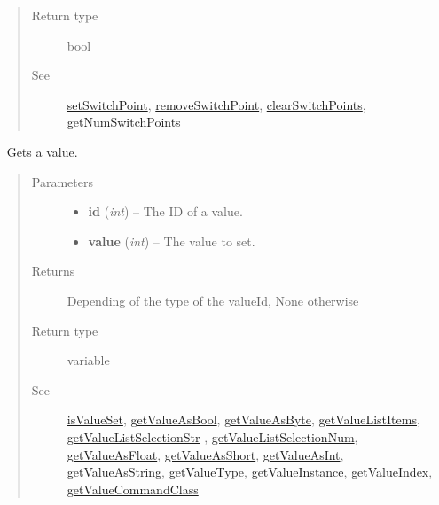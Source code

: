 \documentclass[letterpaper,10pt,english]{sphinxmanual}
\begin{document}
\begin{fulllineitems}
\begin{fulllineitems}
\begin{quote}
\begin{description}
\item[{Return type}] \leavevmode
bool

\item[{See}] \leavevmode
{\hyperref[libopenzwave:setswitchpoint]{setSwitchPoint}}, {\hyperref[libopenzwave:removeswitchpoint]{removeSwitchPoint}}, {\hyperref[libopenzwave:clearswitchpoints]{clearSwitchPoints}}, {\hyperref[libopenzwave:getnumswitchpoints]{getNumSwitchPoints}}

\end{description}\end{quote}

\end{fulllineitems}


\begin{fulllineitems}
\label{libopenzwave:libopenzwave.PyManager.getValue}~\label{libopenzwave:getvalue}
Gets a value.
\begin{quote}\begin{description}
\item[{Parameters}] \leavevmode\begin{itemize}
\item {} 
\textbf{id} (\emph{int}) -- The ID of a value.

\item {} 
\textbf{value} (\emph{int}) -- The value to set.

\end{itemize}

\item[{Returns}] \leavevmode
Depending of the type of the valueId, None otherwise

\item[{Return type}] \leavevmode
variable

\item[{See}] \leavevmode
{\hyperref[libopenzwave:isvalueset]{isValueSet}}, {\hyperref[libopenzwave:getvalueasbool]{getValueAsBool}}, {\hyperref[libopenzwave:getvalueasbyte]{getValueAsByte}}, {\hyperref[libopenzwave:getvaluelistitems]{getValueListItems}}, {\hyperref[libopenzwave:getvaluelistselectionstr]{getValueListSelectionStr}} , {\hyperref[libopenzwave:getvaluelistselectionnum]{getValueListSelectionNum}}, {\hyperref[libopenzwave:getvalueasfloat]{getValueAsFloat}}, {\hyperref[libopenzwave:getvalueasshort]{getValueAsShort}}, {\hyperref[libopenzwave:getvalueasint]{getValueAsInt}}, {\hyperref[libopenzwave:getvalueasstring]{getValueAsString}}, {\hyperref[libopenzwave:getvaluetype]{getValueType}}, {\hyperref[libopenzwave:getvalueinstance]{getValueInstance}}, {\hyperref[libopenzwave:getvalueindex]{getValueIndex}}, {\hyperref[libopenzwave:getvaluecommandclass]{getValueCommandClass}}


\end{description}
\end{quote}
\end{fulllineitems}
\end{fulllineitems}
\end{document}
